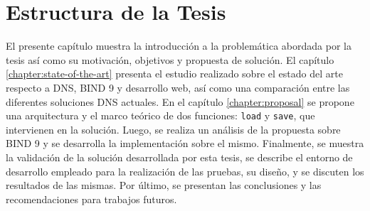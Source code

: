 

\section{Estructura de la Tesis}

El presente capítulo muestra la introducción a la problemática abordada
por la tesis así como su motivación, objetivos y propuesta de solución. El capítulo \ref{chapter:state-of-the-art} presenta el estudio realizado sobre el estado del arte respecto a DNS, BIND 9 y desarrollo web, así como una comparación entre las diferentes soluciones DNS actuales. En el capítulo \ref{chapter:proposal} se propone una arquitectura y el marco teórico de dos funciones: \verb|load| y \verb|save|, que intervienen en la solución. Luego, se realiza un análisis de la propuesta sobre BIND 9 y se desarrolla la implementación sobre el mismo. Finalmente, se muestra la validación de la solución desarrollada por esta tesis, se describe el entorno de desarrollo empleado para la realización de las pruebas, su diseño, y se discuten los resultados de las mismas. Por último, se presentan las conclusiones y las recomendaciones para trabajos futuros.